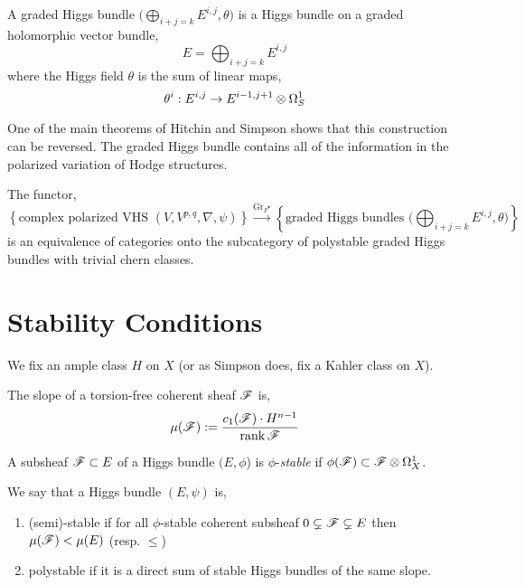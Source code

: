 \documentclass[12pt]{article}
\begin{document}
\begin{defn}
A graded Higgs bundle $\big( \bigoplus\limits_{i+j = k} E^{i,j}, \theta \big)$ is a Higgs bundle on a graded holomorphic vector bundle,
\[ E = \bigoplus_{i + j = k} E^{i,j} \]
where the Higgs field $\theta$ is the sum of linear maps,
\[ \theta^i : E^{i,j} \to E^{i-1,j+1} \otimes \Omega^1_S \]
\end{defn}


One of the main theorems of Hitchin and Simpson shows that this construction can be reversed. The graded Higgs bundle contains all of the information in the polarized variation of Hodge structures. 

\begin{theorem}
The functor,
\[ \left\{ \text{complex polarized VHS } (V, V^{p,q}, \nabla, \psi) \right\} \xrightarrow{\mathrm{Gr}_{F^\bullet}} \left\{ \text{graded Higgs bundles } \big( \bigoplus_{i+j = k} E^{i,j}, \theta \big) \right\} \]
is an equivalence of categories onto the subcategory of polystable graded Higgs bundles with trivial chern classes.
\end{theorem}

\section{Stability Conditions}

We fix an ample class $H$ on $X$ (or as Simpson does, fix a Kahler class on $X$).

\begin{defn}
The slope of a torsion-free coherent sheaf $\mathscr{F}$ is,
\[ \mu(\mathscr{F}) := \frac{c_1(\mathscr{F}) \cdot H^{n-1}}{\operatorname{\mathrm{rank}}{\mathscr{F}}} \]
\end{defn}

\begin{defn}
A subsheaf $\mathscr{F} \subset E$ of a Higgs bundle $(E, \phi$) is $\phi$-\textit{stable} if $\phi(\mathscr{F}) \subset \mathscr{F} \otimes \Omega^1_X$.
\end{defn}

\begin{defn}
We say that a Higgs bundle $(E, \psi)$ is,
\begin{enumerate}
\item (semi)-stable if for all $\phi$-stable coherent subsheaf $0 \subsetneq \mathscr{F} \subsetneq E$ then $\mu(\mathscr{F}) < \mu(E)$ (resp. $\le$)
\item polystable if it is a direct sum of stable Higgs bundles of the same slope.
\end{enumerate}
\end{defn}
\end{document}

